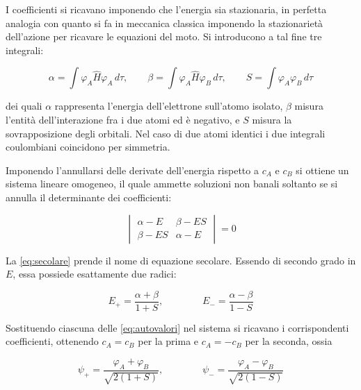 I coefficienti si ricavano imponendo che l'energia sia stazionaria, in perfetta analogia con quanto si fa in meccanica classica imponendo la stazionarietà dell'azione per ricavare le equazioni del moto. Si introducono a tal fine tre integrali:

\begin{equation}
    \alpha = \int \varphi_A \hat{H} \varphi_A \, d\tau, \qquad
    \beta  = \int \varphi_A \hat{H} \varphi_B \, d\tau, \qquad
    S      = \int \varphi_A \varphi_B \, d\tau
    \label{eq:integrali}
\end{equation}

dei quali $\alpha$ rappresenta l'energia dell'elettrone sull'atomo isolato, $\beta$ misura l'entità dell'interazione fra i due atomi ed è negativo, e $S$ misura la sovrapposizione degli orbitali. Nel caso di due atomi identici i due integrali coulombiani coincidono per simmetria.

Imponendo l'annullarsi delle derivate dell'energia rispetto a $c_A$ e $c_B$ si ottiene un sistema lineare omogeneo, il quale ammette soluzioni non banali soltanto se si annulla il determinante dei coefficienti:

\begin{equation}
    \begin{vmatrix}
        \alpha - E & \beta - ES \\
        \beta - ES & \alpha - E
    \end{vmatrix} = 0
    \label{eq:secolare}
\end{equation}

La \eqref{eq:secolare} prende il nome di equazione secolare. Essendo di secondo grado in $E$, essa possiede esattamente due radici:

\begin{equation}
    E_+ = \frac{\alpha + \beta}{1+S}, \qquad\qquad
    E_- = \frac{\alpha - \beta}{1-S}
    \label{eq:autovalori}
\end{equation}

Sostituendo ciascuna delle \eqref{eq:autovalori} nel sistema si ricavano i corrispondenti coefficienti, ottenendo $c_A = c_B$ per la prima e $c_A = -c_B$ per la seconda, ossia

\begin{equation}
    \psi_+ = \frac{\varphi_A + \varphi_B}{\sqrt{2(1+S)}}, \qquad\qquad
    \psi_- = \frac{\varphi_A - \varphi_B}{\sqrt{2(1-S)}}
    \label{eq:orbitali_molecolari}
\end{equation}

